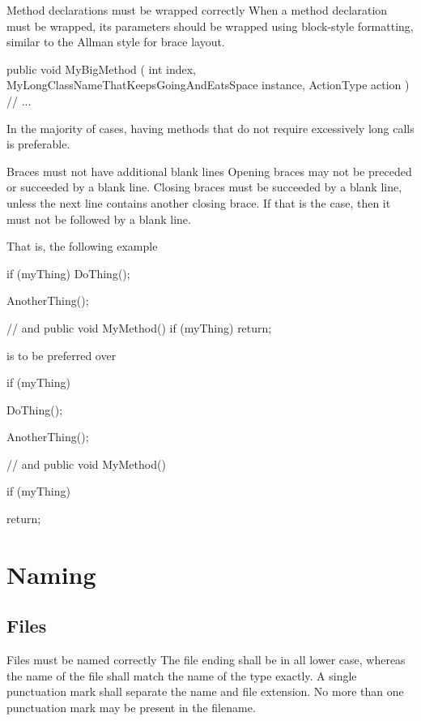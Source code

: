 \documentclass[11pt,a4paper]{article}
\begin{document}
\begin{must}{Method declarations must be wrapped correctly}
When a method declaration must be wrapped, its parameters should be wrapped using block-style formatting, similar to the Allman style for brace layout.
\end{must}

\begin{code}
public void MyBigMethod
(
    int index,
    MyLongClassNameThatKeepsGoingAndEatsSpace instance,
    ActionType action
)
{
    // ...
}
\end{code}

In the majority of cases, having methods that do not require excessively long calls is preferable.

\begin{must}{Braces must not have additional blank lines}
Opening braces may not be preceded or succeeded by a blank line.
Closing braces must be succeeded by a blank line, unless the next line contains another closing brace. If that is the case, then it must not be followed by a blank line.
\end{must}

That is, the following example 
\begin{code}
if (myThing)
{
    DoThing();
}

AnotherThing();

// and
public void MyMethod()
{
    if (myThing)
    {
        return;
    }
}
\end{code}

is to be preferred over

\begin{code}
if (myThing)
{

    DoThing();
}

AnotherThing();

// and
public void MyMethod()
{
    if (myThing)
    {
    
        return;
        
    }
    
}
\end{code}

\section{Naming}
\subsection{Files}
\begin{must}{Files must be named correctly}
The file ending shall be in all lower case, whereas the name of the file shall match the name of the type exactly. A single punctuation mark shall separate the name and file extension. No more than one punctuation mark may be present in the filename.
\end{must}
\end{document}
